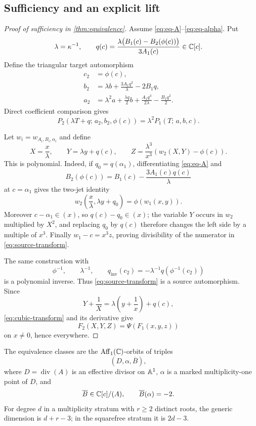 \documentclass[11pt,reqno]{amsart}
\begin{document}
\subsection{Sufficiency and an explicit lift}

\begin{proof}[Proof of sufficiency in \cref{thm:equivalence}]
Assume \eqref{eq:eq-A}--\eqref{eq:eq-alpha}.  Put
\[
\lambda=\kappa^{-1},\qquad
q(c)=
\frac{\lambda\bigl(B_1(c)-B_2(\phi(c))\bigr)}{3A_1(c)}
\in\mathbb C[c].
\]
Define the triangular target automorphism
\begin{align}
c_2&=\phi(c),\label{eq:target-c}\\
b_2&=\lambda b+\frac{3A_1q^2}{\lambda}-2B_1q,\label{eq:target-b}\\
a_2&=\lambda^2a+\frac{\lambda q}{2}b
+\frac{A_1q^3}{2\lambda}-\frac{B_1q^2}{2}.
\label{eq:target-a}
\end{align}
Direct coefficient comparison gives
\begin{equation}
\label{eq:cubic-transform}
P_2(\lambda T+q;\,a_2,b_2,\phi(c))
=\lambda^2P_1(T;\,a,b,c).
\end{equation}

Let \(w_i=w_{A_i,B_i,\alpha_i}\) and define
\begin{equation}
\label{eq:source-transform}
X=\frac{x}{\lambda},\qquad
Y=\lambda y+q(c),\qquad
Z=\frac{\lambda^3}{x^3}
\left(w_2(X,Y)-\phi(c)\right).
\end{equation}
This is polynomial.  Indeed, if \(q_0=q(\alpha_1)\), differentiating
\eqref{eq:eq-A} and
\[
B_2(\phi(c))=B_1(c)-\frac{3A_1(c)q(c)}{\lambda}
\]
at \(c=\alpha_1\) gives the two-jet identity
\[
w_2\left(\frac{x}{\lambda},\lambda y+q_0\right)
=\phi(w_1(x,y)).
\]
Moreover \(c-\alpha_1\in(x)\), so \(q(c)-q_0\in(x)\); the variable \(Y\)
occurs in \(w_2\) multiplied by \(X^2\), and replacing \(q_0\) by \(q(c)\)
therefore changes the left side by a multiple of \(x^3\).  Finally
\(w_1-c=x^3z\), proving divisibility of the numerator in
\eqref{eq:source-transform}.

The same construction with
\[
\phi^{-1},\qquad \lambda^{-1},\qquad
q_{\mathrm{inv}}(c_2)
=-\lambda^{-1}q(\phi^{-1}(c_2))
\]
is a polynomial inverse.  Thus \eqref{eq:source-transform} is a source
automorphism.  Since
\[
Y+\frac1X=\lambda\left(y+\frac1x\right)+q(c),
\]
\eqref{eq:cubic-transform} and its derivative give
\[
F_2(X,Y,Z)=\Psi(F_1(x,y,z))
\]
on \(x\ne0\), hence everywhere.
\end{proof}

\begin{corollary}
\label{cor:moduli-data}
The equivalence classes are the
\(\operatorname{Aff}_1(\mathbb C)\)-orbits of triples
\[
(D,\alpha,\overline B),
\]
where \(D=\operatorname{div}(A)\) is an effective divisor on \(\mathbb A^1\),
\(\alpha\) is a marked multiplicity-one point of \(D\), and
\[
\overline B\in\mathbb C[c]/(A),\qquad \overline B(\alpha)=-2.
\]
For degree \(d\) in a multiplicity stratum with \(r\ge2\) distinct roots,
the generic dimension is \(d+r-3\); in the squarefree stratum it is
\(2d-3\).
\end{corollary}
\end{document}
